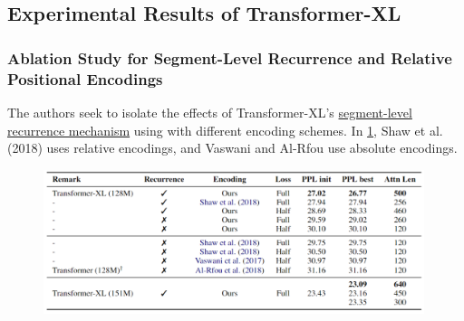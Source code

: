 \subsection{Experimental Results of Transformer-XL} \label{sec:ExpResultsTransXL}

\subsubsection{Ablation Study for Segment-Level Recurrence and Relative Positional Encodings}

The authors seek to isolate the effects of Transformer-XL's \hyperref[sec:SegmentLevelRec]{segment-level recurrence mechanism} using with different encoding schemes. In \cref{tbl:transXL_ablationRECURR}, Shaw et al. (2018) uses relative encodings, and Vaswani and Al-Rfou use absolute encodings. 






\begin{figure}[h]
\vspace{-5pt}
\centering
\includegraphics[width=0.99\textwidth]{imgs/table_transXL_ablationREC.png}
\vspace{-5pt}
\vspace{-5pt}
\label{tbl:transXL_ablationRECURR}
\end{figure}


